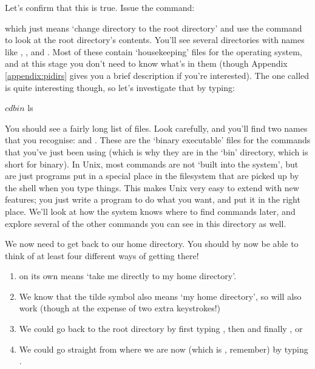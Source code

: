 Let's confirm that this is true. Issue the command:

which just means `change directory to the root directory' and use the  command to look at the root directory's contents. You'll see several directories with names like , ,  and . Most of these contain `housekeeping' files for the operating system, and at this stage you don't need to know what's in them (though Appendix \ref{appendix:pidirs} gives you a brief description if you're interested). The one called  is quite interesting though, so let's investigate that by typing: 

\begin{ttoutenv}
$ cd bin
$ ls
\end{ttoutenv}

\noindent You should see a fairly long list of files. Look carefully, and you'll find two names that you recognise:  and . These are the `binary executable' files for the commands that you've just been using (which is why they are in the `bin' directory, which is short for binary). In Unix, most commands are not `built into the system', but are just programs put in a special place in the filesystem that are picked up by the shell when you type things. This makes Unix very easy to extend with new features; you just write a program to do what you want, and put it in the right place. We'll look at how the system knows where to find commands later, and explore several of the other commands you can see in this directory as well. 

We now need to get back to our home directory. You should by now be able to think of at least four different ways of getting there!

\begin{enumerate}
\item {} on its own means `take me directly to my home directory'.
\item We know that the tilde symbol also means `my home directory', so  will also work (though at the expense of two extra keystrokes!)
\item We could go back to the root directory by first typing , then  and finally , or 
\item We could go straight from where we are now (which is , remember) by typing . 
\end{enumerate}

